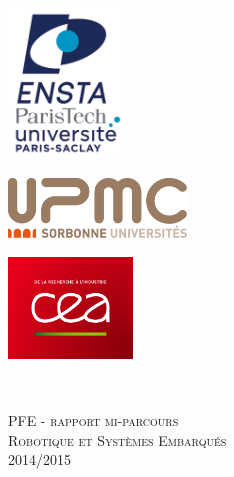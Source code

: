 \begin{titlepage}

\newcommand{\HRule}{\rule{\linewidth}{0.5mm}}
\center

\begin{minipage}{0.32\textwidth}
\begin{flushleft}
	\includegraphics[height=4.0cm]{./images/logo_ensta.jpg}
\end{flushleft}
\end{minipage}
\begin{minipage}{0.32\textwidth}
\begin{center}
	\includegraphics[height=1.6cm]{./images/upmc.png}
\end{center}
\end{minipage}
\begin{minipage}{0.32\textwidth}
\begin{flushright}
	\includegraphics[height=2.7cm]{./images/cea.png}
\end{flushright}
\end{minipage}
\mbox{}\\[1.5cm]


\textsc{\LARGE PFE - rapport mi-parcours}\\[0.3cm]
\textsc{\Large Robotique et Systèmes Embarqués}\\[0.3cm]
\Large{2014/2015}\\[0.6cm]



\end{titlepage}
